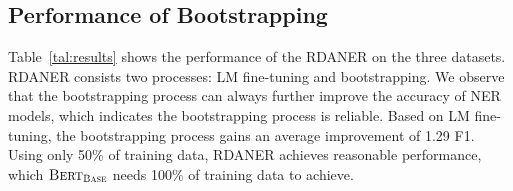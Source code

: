\documentclass[10pt, conference, compsocconf]{IEEEtran}
\newcommand{\bert}{\textsc{Bert}\xspace}
\newcommand{\scibert}{\textsc{SciBert}\xspace}
\newcommand{\biobert}{\textsc{BioBert}\xspace}
\newcommand{\Scierc}{\textsc{S}ci-\textsc{erc}\xspace}
\newcommand{\rdaner}{\textsc{RDANER}\xspace}
\newcommand{\bertbio}{$\bert_{\textsc{BIO}}$\xspace}
\newcommand{\bertbase}{$\bert_{\textsc{Base}}$\xspace}
\begin{document}




\subsection{Performance of Bootstrapping}

Table~\ref{tal:results} shows the performance of the \rdaner on the three datasets.
\rdaner consists two processes: LM fine-tuning and bootstrapping. 
We observe that the bootstrapping process can always further improve the accuracy of NER models, which indicates
the bootstrapping process is reliable.
Based on LM fine-tuning, the bootstrapping process gains an average improvement of 1.29 F1.
Using only 50\% of training data, \rdaner achieves reasonable performance, which
\bertbase needs 100\% of training data to achieve.
\end{document}
